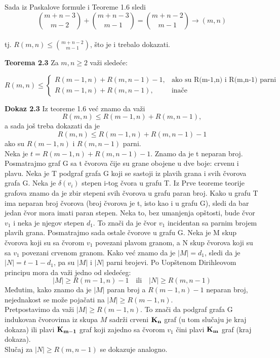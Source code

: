 \documentclass[12pt,a4paper]{article}
\begin{document}
	Sada iz Paskalove formule i Teoreme 1.6 sledi 
	\[{m+n-3\choose m-2}+{m+n-3\choose m-1}={m+n-2\choose m-1}\rightarrow (m,n)\] 
	\\
	\vspace{0.7em} tj. $R(m,n) \leq {m+n-2\choose m-1}$, što je i trebalo dokazati. 
	
	{\noindent\fontsize{12pt}{12pt}\textbf{Teorema 2.3}}
	Za $m,n\geq 2$  važi sledeće:
	
	\[
   	 R(m,n)\leq 
		\begin{cases}
    		R(m-1,n)+R(m,n-1)-1,& \text{ako su R(m-1,n) i R(m,n-1) parni}\\
    	R(m-1,n)+R(m,n-1),      & \text{inače}
	\end{cases}
	\]
	
	{\noindent\fontsize{12pt}{12pt}\textbf{Dokaz 2.3}}
	Iz teoreme 1.6 već znamo da važi
	\[R(m,n)\leq R(m-1,n)+R(m,n-1),\]
	a sada još treba dokazati da je
	\[R(m,n)\leq R(m-1,n)+R(m,n-1)-1\] 
	ako su $R(m-1,n)$ i $R(m,n-1)$ parni.
	\vspace{0.5em}
	\\
	\noindent Neka je $t=R(m-1,n)+R(m,n-1)-1$.
	Znamo da je t neparan broj. Posmatrajmo graf G sa t čvorova čije su grane obojene u dve boje: crvenu i plavu. Neka je T podgraf grafa G koji se sastoji iz plavih grana i svih čvorova grafa G. Neka je $\delta(v_i)$ stepen i-tog čvora u grafu T. Iz Prve teoreme teorije grafova znamo da je zbir stepeni svih čvorova u grafu paran broj. Kako u grafu T ima neparan broj čvorova (broj čvorova je t, isto kao i u grafu G), sledi da bar jedan čvor mora imati paran stepen. Neka to, bez umanjenja opštosti, bude čvor $v_1$ i neka je njegov stepen $d_1$. To znači da je čvor $v_1$ incidentan sa parnim brojem plavih grana. Posmatrajmo sada ostale čvorove u grafu G. Neka je M skup čvorova koji su sa čvorom $v_1$ povezani plavom granom, a N skup čvorova koji su sa $v_1$ povezani crvenom granom. Kako već znamo da je $|M| = d_1$,  sledi da je $|N| = t-1-d_1$, pa su $|M|$ i $|N|$ parni brojevi. Po Uopštenom Dirihleovom principu mora da važi jedno od sledećeg:
	\[|M|\geq R(m-1,n)-1 \quad \text{ili} \quad  |N|\geq R(m,n-1)\] 
	Međutim, kako znamo da je $|M|$ paran broj a $R(m-1,n)-1$ neparan broj, nejednakost se može pojačati na $|M|\geq R(m-1,n)$. \\
	Pretpostavimo da važi $|M|\geq R(m-1,n)$. To znači da podgraf grafa G indukovan čvorovima iz skupa $M$ sadrži crveni $\bf K_n$ graf (u tom slučaju je kraj dokaza) ili plavi $\bf K_{m-1}$ graf koji zajedno sa čvorom $v_1$ čini plavi $\bf K_{m}$ graf (kraj dokaza).\\
	Slučaj za $|N|\geq R(m,n-1)$ se dokazuje analogno.\\
	
\end{document}

